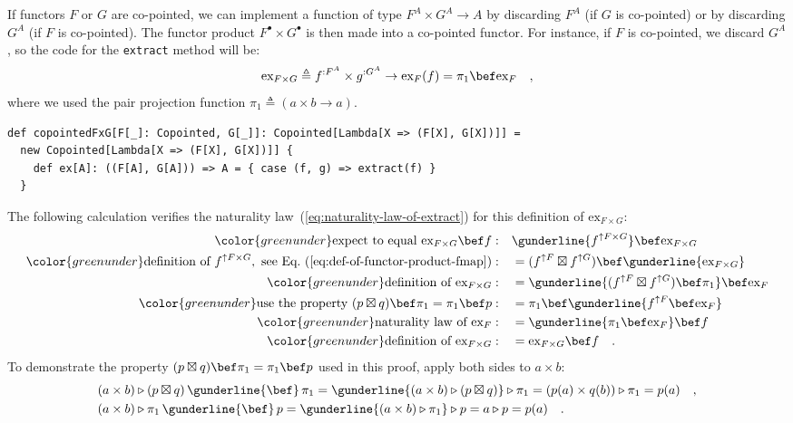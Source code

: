 If functors $F$ or $G$ are co-pointed, we can implement a function
of type $F^{A}\times G^{A}\rightarrow A$ by discarding $F^{A}$ (if
$G$ is co-pointed) or by discarding $G^{A}$ (if $F$ is co-pointed).
The functor product $F^{\bullet}\times G^{\bullet}$ is then made
into a co-pointed functor. For instance, if $F$ is co-pointed, we
discard $G^{A}$, so the code for the \lstinline!extract! method
will be:
\[
\text{ex}_{F\times G}\triangleq f^{:F^{A}}\times g^{:G^{A}}\rightarrow\text{ex}_{F}(f)=\pi_{1}\bef\text{ex}_{F}\quad,
\]
where we used the pair projection function $\pi_{1}\triangleq(a\times b\rightarrow a)$.
\begin{lstlisting}
def copointedFxG[F[_]: Copointed, G[_]]: Copointed[Lambda[X => (F[X], G[X])]] =
  new Copointed[Lambda[X => (F[X], G[X])]] {
    def ex[A]: ((F[A], G[A])) => A = { case (f, g) => extract(f) }
  }
\end{lstlisting}
The following calculation verifies the naturality law~(\ref{eq:naturality-law-of-extract})
for this definition of $\text{ex}_{F\times G}$:
\begin{align*}
{\color{greenunder}\text{expect to equal }\text{ex}_{F\times G}\bef f:}\quad & \gunderline{f^{\uparrow F\times G}}\bef\text{ex}_{F\times G}\\
{\color{greenunder}\text{definition of }f^{\uparrow F\times G},\text{ see Eq.~(\ref{eq:def-of-functor-product-fmap})}:}\quad & =(f^{\uparrow F}\boxtimes f^{\uparrow G})\bef\gunderline{\text{ex}_{F\times G}}\\
{\color{greenunder}\text{definition of }\text{ex}_{F\times G}:}\quad & =\gunderline{(f^{\uparrow F}\boxtimes f^{\uparrow G})\bef\pi_{1}}\bef\text{ex}_{F}\\
{\color{greenunder}\text{use the property }(p\boxtimes q)\bef\pi_{1}=\pi_{1}\bef p:}\quad & =\pi_{1}\bef\gunderline{f^{\uparrow F}\bef\text{ex}_{F}}\\
{\color{greenunder}\text{naturality law of }\text{ex}_{F}:}\quad & =\gunderline{\pi_{1}\bef\text{ex}_{F}}\bef f\\
{\color{greenunder}\text{definition of }\text{ex}_{F\times G}:}\quad & =\text{ex}_{F\times G}\bef f\quad.
\end{align*}
To demonstrate the property $(p\boxtimes q)\bef\pi_{1}=\pi_{1}\bef p$
used in this proof, apply both sides to $a\times b$:
\begin{align*}
 & (a\times b)\triangleright(p\boxtimes q)\,\gunderline{\bef}\,\pi_{1}=\gunderline{(a\times b)\triangleright(p\boxtimes q)}\triangleright\pi_{1}=(p(a)\times q(b))\triangleright\pi_{1}=p(a)\quad,\\
 & (a\times b)\triangleright\pi_{1}\,\gunderline{\bef}\,p=\gunderline{(a\times b)\triangleright\pi_{1}}\triangleright p=a\triangleright p=p(a)\quad.
\end{align*}



